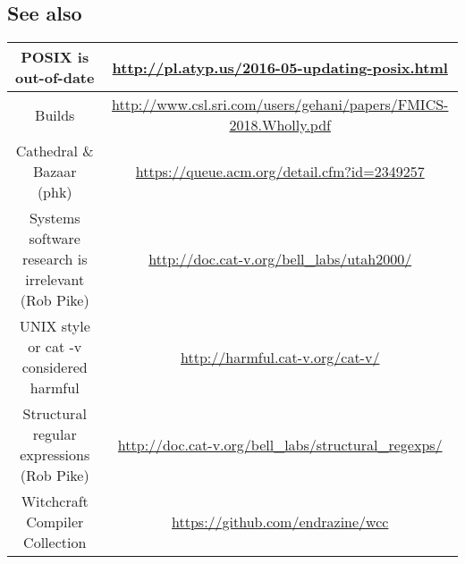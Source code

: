 \documentclass[a4paper,utf8,11pt]{article}
\begin{document}
	\subsection{See also}
	\begin{tabular}{|c|c|}
		\hline
		POSIX is out-of-date & \url{http://pl.atyp.us/2016-05-updating-posix.html} \\
		\hline
		Builds & \url{http://www.csl.sri.com/users/gehani/papers/FMICS-2018.Wholly.pdf} \\
		\hline
		Cathedral \& Bazaar (phk) & \url{https://queue.acm.org/detail.cfm?id=2349257}\\
		\hline
		Systems software research is irrelevant (Rob Pike) & \url{http://doc.cat-v.org/bell_labs/utah2000/}\\
		UNIX style or cat -v considered harmful & \url{http://harmful.cat-v.org/cat-v/}\\
		Structural regular expressions (Rob Pike) & \url{http://doc.cat-v.org/bell_labs/structural_regexps/}\\
		\hline
		Witchcraft Compiler Collection & \url{https://github.com/endrazine/wcc}\\
		\hline
	\end{tabular}
\end{document}
